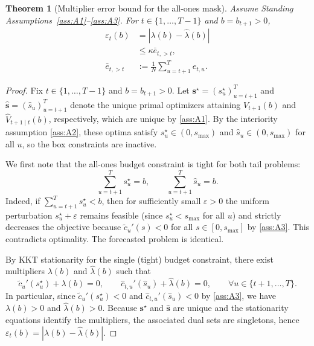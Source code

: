 \documentclass{uai2026} %
\newtheorem{theorem}{Theorem}[section]
\newcommand{\1}{\mathbf{1}}
\renewcommand{\epsilon}{\varepsilon}
\begin{document}
\begin{theorem}[Multiplier error bound for the all-ones mask]
  \label{thm:epsilon-allones-app}%
  Assume Standing Assumptions~\ref{ass:A1}--\ref{ass:A3}.
  For $t \in \{1,\dots,T-1\}$ and $b = b_{t+1} > 0$,
  \begin{equation}
    \label{eq:epsilon-allones-app}
    \begin{aligned}
      \epsilon_t(b)
      &= |\lambda(b)-\hat{\lambda}(b)|\\
      &\le \kappa\bar{e}_{t,>t},\\
      \bar{e}_{t,>t}
      &:= \frac{1}{N}\sum_{u=t+1}^{T} e_{t,u}.
    \end{aligned}
  \end{equation}
\end{theorem}

\begin{proof}
  Fix $t \in \{1,\dots,T-1\}$ and $b = b_{t+1} > 0$.
  Let $\mathbf{s}^\star = (s_u^\star)_{u=t+1}^{T}$ and $\hat{\mathbf{s}} = (\hat{s}_u)_{u=t+1}^{T}$ denote the unique primal optimizers attaining $V_{t+1}(b)$ and $\hat{V}_{t+1\mid t}(b)$, respectively, which are unique by \ref{ass:A1}.
  By the interiority assumption \ref{ass:A2}, these optima satisfy $s_u^\star \in (0,s_{\max})$ and $\hat{s}_u \in (0,s_{\max})$ for all $u$, so the box constraints are inactive.

  We first note that the all-ones budget constraint is tight for both tail problems:
  \begin{equation*}
    \sum_{u=t+1}^{T} s_u^\star = b,
    \qquad
    \sum_{u=t+1}^{T} \hat{s}_u = b.
  \end{equation*}
  Indeed, if $\sum_{u=t+1}^{T} s_u^\star < b$, then for sufficiently small $\varepsilon>0$ the uniform perturbation $s_u^\star+\varepsilon$ remains feasible (since $s_u^\star<s_{\max}$ for all $u$) and strictly decreases the objective because $\tilde{c}_u'(s)<0$ for all $s \in [0,s_{\max}]$ by \ref{ass:A3}. This contradicts optimality. The forecasted problem is identical.

  By KKT stationarity for the single (tight) budget constraint, there exist multipliers $\lambda(b)$ and $\hat{\lambda}(b)$ such that
  \begin{equation*}
    \tilde{c}_u'(s_u^\star)+\lambda(b)=0,
    \qquad
    \hat{c}_{t,u}'(\hat{s}_u)+\hat{\lambda}(b)=0,
    \qquad
    \forall u \in \{t+1,\dots,T\}.
  \end{equation*}
  In particular, since $\tilde{c}_u'(s_u^\star)<0$ and $\hat{c}_{t,u}'(\hat{s}_u)<0$ by \ref{ass:A3}, we have $\lambda(b)>0$ and $\hat{\lambda}(b)>0$.
  Because $\mathbf{s}^\star$ and $\hat{\mathbf{s}}$ are unique and the stationarity equations identify the multipliers, the associated dual sets are singletons, hence $\epsilon_t(b)=|\lambda(b)-\hat{\lambda}(b)|$.


\end{proof}
\end{document}
